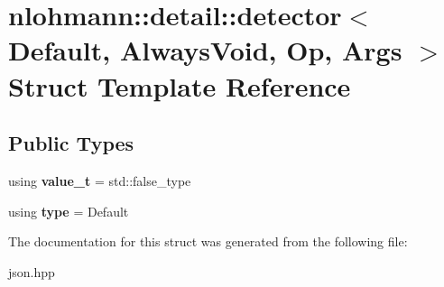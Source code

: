\hypertarget{structnlohmann_1_1detail_1_1detector}{}\section{nlohmann\+:\+:detail\+:\+:detector$<$ Default, Always\+Void, Op, Args $>$ Struct Template Reference}
\label{structnlohmann_1_1detail_1_1detector}
\subsection*{Public Types}
\begin{DoxyCompactItemize}
\item 
\mbox{\label{structnlohmann_1_1detail_1_1detector_a5a132aab543d1706e2439268faf8d487}} 
using {\bfseries value\+\_\+t} = std\+::false\+\_\+type
\item 
\mbox{\label{structnlohmann_1_1detail_1_1detector_a0cd69423587748bf3d3d702cc7b7c2ce}} 
using {\bfseries type} = Default
\end{DoxyCompactItemize}


The documentation for this struct was generated from the following file\+:\begin{DoxyCompactItemize}
\item 
json.\+hpp\end{DoxyCompactItemize}

